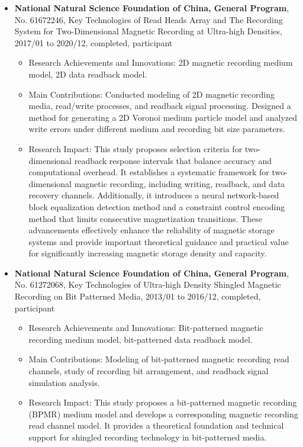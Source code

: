\documentclass[en]{resume}
\begin{document}
\begin{itemize}
  \item \textbf{National Natural Science Foundation of China, General Program}, No. 61672246, Key Technologies of Read Heads Array and The Recording System for
  Two-Dimensional Magnetic Recording at Ultra-high Densities, 2017/01 to 2020/12, completed, participant
  \begin{itemize}
    \item Research Achievements and Innovations: 2D magnetic recording medium model, 2D data readback model.
    \item Main Contributions: Conducted modeling of 2D magnetic recording media, read/write processes, and readback signal processing. Designed a method for generating a 2D Voronoi medium particle model and analyzed write errors under different medium and recording bit size parameters.
    \item Research Impact: This study proposes selection criteria for two-dimensional readback response intervals that balance accuracy and computational overhead. It establishes a systematic framework for two-dimensional magnetic recording, including writing, readback, and data recovery channels. Additionally, it introduces a neural network-based block equalization detection method and a constraint control encoding method that limits consecutive magnetization transitions. These advancements effectively enhance the reliability of magnetic storage systems and provide important theoretical guidance and practical value for significantly increasing magnetic storage density and capacity.
  \end{itemize}

  \item \textbf{National Natural Science Foundation of China, General Program}, No. 61272068, Key Technologies of Ultra-high Density Shingled Magnetic Recording on Bit Patterned Media, 2013/01 to 2016/12, completed, participant
  \begin{itemize}
    \item Research Achievements and Innovations: Bit-patterned magnetic recording medium model, bit-patterned data readback model.
    \item Main Contributions: Modeling of bit-patterned magnetic recording read channels, study of recording bit arrangement, and readback signal simulation analysis.
    \item Research Impact: This study proposes a bit-patterned magnetic recording (BPMR) medium model and develops a corresponding magnetic recording read channel model. It provides a theoretical foundation and technical support for shingled recording technology in bit-patterned media.
  \end{itemize}


\end{itemize}
\end{document}
